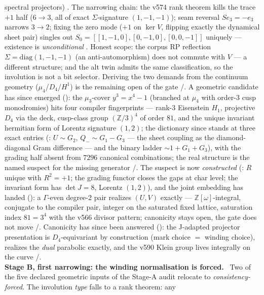 \begin{winbox}
spectral projectors) \mE.  The narrowing chain: the v574 rank theorem
kills the trace $+1$ half ($6\to3$, all of exact $\Sigma$-signature
$(1,-1,-1)$); seam reversal $Se_3=-e_3$ narrows $3\to2$; fixing the
zero mode ($+1$ on $\ker V$, flipping exactly the dynamical sheet
pair) singles out $S_0=[[1,-1,0],[0,-1,0],[0,0,-1]]$ uniquely ---
existence is \emph{unconditional} \mE.  Honest scope: the corpus RP
reflection $\Sigma=\mathrm{diag}(1,-1,-1)$ (an anti-automorphism) does
not commute with $V$ --- a different structure; and the alt twin admits
the same classification, so the involution is not a bit selector.
Deriving the two demands from the continuum geometry
($\mu_4$/$D_4$/$H^1$) is the remaining open of the gate \mE/\mC.
A geometric candidate has since emerged
(): the $\mu_3$-cover $y^3=x^4-1$
(branched at $\mu_4$ with order-3 cusp monodromies) hits four compiler
fingerprints --- rank-3 Eisenstein $H_1$, projective $D_4$ via the
deck, cusp-class group $(\mathbb{Z}/3)^4$ of order $81$, and the
unique invariant hermitian form of Lorentz signature $(1,2)$; the
dictionary since stands at three exact entries
(: $U\sim G_2$, $Q_-\sim G_1-G_3$
--- the sheet coupling as the diamond-diagonal Gram difference ---
and the binary ladder $\sim1+G_1+G_3$), with the grading half absent
from $7296$ canonical combinations; the real structure is the named
suspect for the missing generator \mE/\mC.  The suspect is now
\emph{constructed} (: $R$ unique with
$R^2=+1$; the grading functor closes the gaps at char level; the
invariant form has $\det J=8$, Lorentz $(1,2)$), and the joint
embedding has landed (): a
$\Gamma$-even degree-2 pair realizes $(U,V)$ exactly ---
$\mathbb{Z}[\omega]$-integral, conjugate to the compiler pair,
integer on the saturated fixed lattice, saturation index $81=3^4$
with the v566 divisor pattern; canonicity stays open, the gate does
not move \mE/\mC.  Canonicity has since been answered
(): the J-adapted projector
presentation is $D_4$-equivariant by construction (mark choice $=$
winding choice), realizes the \emph{dual} parabolic exactly, and the
v590 Klein group lives integrally on the curve \mE/\mC.
\smallskip\\
\noindent\textbf{Stage B, first narrowing: the winding normalisation is forced.}
\ Two of the five declared geometric inputs of the Stage-A audit
relocate to \emph{consistency-forced}.  The involution \emph{type} falls to a rank theorem: any

\end{winbox}
